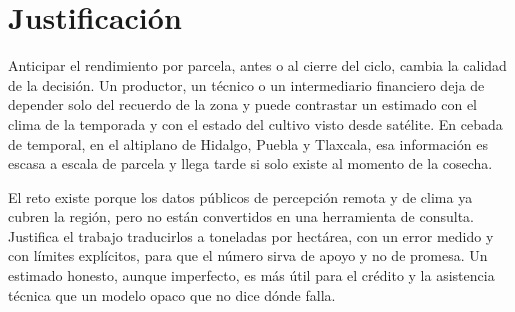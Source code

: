 \section{Justificación}

Anticipar el rendimiento por parcela, antes o al cierre del ciclo, cambia la calidad de la decisión. Un productor, un técnico o un intermediario financiero deja de depender solo del recuerdo de la zona y puede contrastar un estimado con el clima de la temporada y con el estado del cultivo visto desde satélite. En cebada de temporal, en el altiplano de Hidalgo, Puebla y Tlaxcala, esa información es escasa a escala de parcela y llega tarde si solo existe al momento de la cosecha.

El reto existe porque los datos públicos de percepción remota y de clima ya cubren la región, pero no están convertidos en una herramienta de consulta. Justifica el trabajo traducirlos a toneladas por hectárea, con un error medido y con límites explícitos, para que el número sirva de apoyo y no de promesa. Un estimado honesto, aunque imperfecto, es más útil para el crédito y la asistencia técnica que un modelo opaco que no dice dónde falla.
